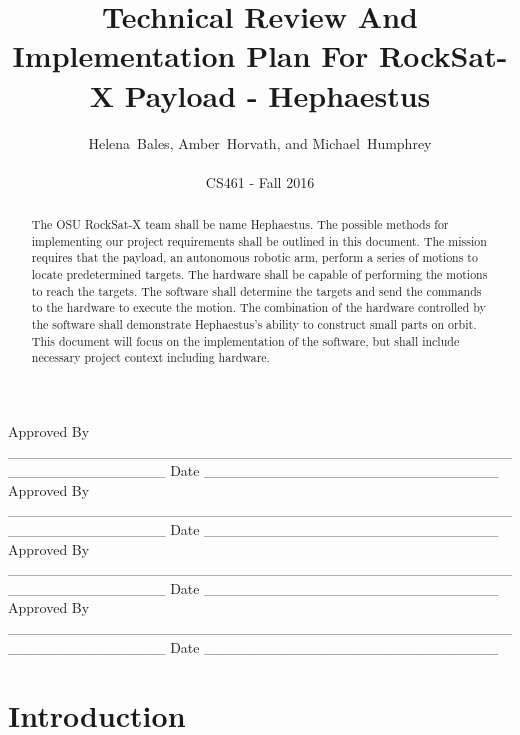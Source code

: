 \documentclass[letterpaper,10pt]{article}
\title{Technical Review And Implementation Plan For RockSat-X Payload - Hephaestus}
\author{Helena~Bales, Amber~Horvath, and Michael~Humphrey\\ \\ CS461 - Fall 2016}
\newenvironment{bottompar}{\par\vspace*{\fill}}{\clearpage}
\begin{document}
\maketitle

\begin{abstract}
The \gls{OSU} RockSat-X team shall be name Hephaestus.
The possible methods for implementing our project requirements shall be outlined in this document.
The mission requires that the payload, an autonomous robotic arm, perform a series of motions to locate predetermined targets.
The hardware shall be capable of performing the motions to reach the targets.
The software shall determine the targets and send the commands to the hardware to execute the motion.
The combination of the hardware controlled by the software shall demonstrate Hephaestus's ability to construct small parts on orbit.
This document will focus on the implementation of the software, but shall include necessary project context including hardware.
\end{abstract}

\begin{bottompar}
Approved By
\_\_\_\_\_\_\_\_\_\_\_\_\_\_\_\_\_\_\_\_\_\_\_\_\_\_\_\_\_\_\_\_\_\_\_\_\_\_\_\_\_\_\_\_\_\_\_\_\_\_\_\_\_\_\_\_\_\_\_\_\_\_\_
Date \_\_\_\_\_\_\_\_\_\_\_\_\_\_\_\_\_\_\_\_\_\_\_\_\_\_\_\_ \\


Approved By
\_\_\_\_\_\_\_\_\_\_\_\_\_\_\_\_\_\_\_\_\_\_\_\_\_\_\_\_\_\_\_\_\_\_\_\_\_\_\_\_\_\_\_\_\_\_\_\_\_\_\_\_\_\_\_\_\_\_\_\_\_\_\_
Date \_\_\_\_\_\_\_\_\_\_\_\_\_\_\_\_\_\_\_\_\_\_\_\_\_\_\_\_ \\


Approved By
\_\_\_\_\_\_\_\_\_\_\_\_\_\_\_\_\_\_\_\_\_\_\_\_\_\_\_\_\_\_\_\_\_\_\_\_\_\_\_\_\_\_\_\_\_\_\_\_\_\_\_\_\_\_\_\_\_\_\_\_\_\_\_
Date \_\_\_\_\_\_\_\_\_\_\_\_\_\_\_\_\_\_\_\_\_\_\_\_\_\_\_\_ \\


Approved By
\_\_\_\_\_\_\_\_\_\_\_\_\_\_\_\_\_\_\_\_\_\_\_\_\_\_\_\_\_\_\_\_\_\_\_\_\_\_\_\_\_\_\_\_\_\_\_\_\_\_\_\_\_\_\_\_\_\_\_\_\_\_\_
Date \_\_\_\_\_\_\_\_\_\_\_\_\_\_\_\_\_\_\_\_\_\_\_\_\_\_\_\_ \\
\end{bottompar}

\clearpage
\tableofcontents
\clearpage

\section{Introduction}
\end{document}

